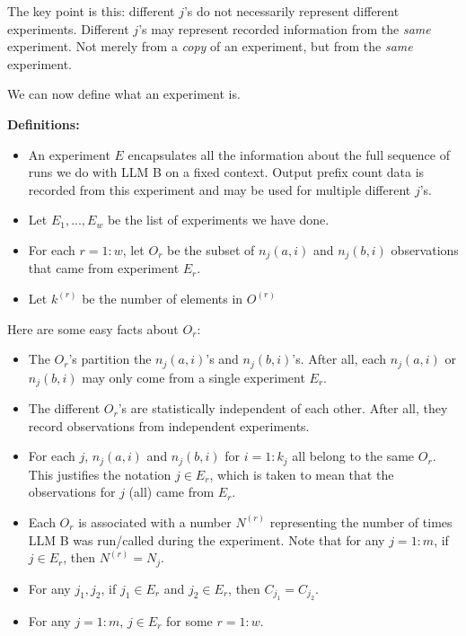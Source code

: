 \documentclass{article}
\begin{document}
The key point is this: different $\displaystyle j$'s do not necessarily represent different experiments. Different $\displaystyle j$'s may represent recorded information from the \textit{same} experiment. Not merely from a\textit{ copy} of an experiment, but from the \textit{same} experiment.



We can now define what an experiment is.



\textbf{Definitions:}
\begin{itemize}
\item An experiment $\displaystyle E$ encapsulates all the information about the full sequence of runs we do with LLM B on a fixed context. Output prefix count data is recorded from this experiment and may be used for multiple different $\displaystyle j$'s.
\item Let $\displaystyle E_{1} ,...,E_{w}$ be the list of experiments we have done.
\item For each $\displaystyle r=1:w$, let $\displaystyle O_{r}$ be the subset of $\displaystyle n_{j}\left( a,i\right)$ and $\displaystyle n_{j}\left( b,i\right)$ observations that came from experiment $\displaystyle E_{r}$.
\item Let $\displaystyle k^{\left( r\right)}$ be the number of elements in $\displaystyle O^{\left( r\right)}$
\end{itemize}



Here are some easy facts about $\displaystyle O_{r}$:
\begin{itemize}
\item The $\displaystyle O_{r}$'s partition the $\displaystyle n_{j}\left( a,i\right)$'s and $\displaystyle n_{j}\left( b,i\right)$'s. After all, each $\displaystyle n_{j}\left( a,i\right)$ or $\displaystyle n_{j}\left( b,i\right)$ may only come from a single experiment $\displaystyle E_{r}$.
\item The different $\displaystyle O_{r}$'s are statistically independent of each other. After all, they record observations from independent experiments.
\item For each $\displaystyle j$, $\displaystyle n_{j}\left( a,i\right)$ and $\displaystyle n_{j}\left( b,i\right)$ for $\displaystyle i=1:k_{j}$ all belong to the same $\displaystyle O_{r}$. This justifies the notation $\displaystyle j\in E_{r}$, which is taken to mean that the observations for $\displaystyle j$ (all) came from $\displaystyle E_{r}$.
\item Each $\displaystyle O_{r}$ is associated with a number $\displaystyle N^{\left( r\right)}$ representing the number of times LLM B was run/called during the experiment. Note that for any $\displaystyle j=1:m$, if $\displaystyle j\in E_{r}$, then $\displaystyle N^{\left( r\right)} =N_{j}$.
\item For any $\displaystyle j_{1} ,j_{2}$, if $\displaystyle j_{1} \in E_{r}$ and $\displaystyle j_{2} \in E_{r}$, then $\displaystyle C_{j_{1}} =C_{j_{2}}$.
\item For any $\displaystyle j=1:m$, $\displaystyle j\in E_{r}$ for some $\displaystyle r=1:w$.
\end{itemize}
\end{document}
